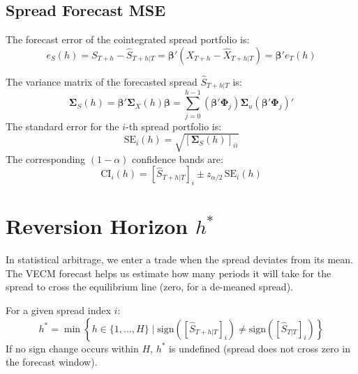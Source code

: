 \documentclass[10pt,a4paper,twocolumn]{article}
\newcommand{\bbeta}{\boldsymbol{\beta}}
\newcommand{\bSigma}{\boldsymbol{\Sigma}}
\newcommand{\bPhi}{\boldsymbol{\Phi}}
\begin{document}
\subsection{Spread Forecast MSE}
The forecast error of the cointegrated spread portfolio is:
\[
  e_S(h) = S_{T+h} - \hat{S}_{T+h|T} = \bbeta' \left( X_{T+h} - \hat{X}_{T+h|T} \right) = \bbeta' e_T(h)
\]

\begin{tcolorbox}[mathbox={Spread Forecast Variance and Confidence Bands}]
The variance matrix of the forecasted spread $\hat{S}_{T+h|T}$ is:
\begin{equation}
  \bSigma_S(h) = \bbeta' \bSigma_X(h) \bbeta = \sum_{j=0}^{h-1} \left( \bbeta' \bPhi_j \right) \bSigma_u \left( \bbeta' \bPhi_j \right)'
  \label{eq:spread_mse}
\end{equation}
The standard error for the $i$-th spread portfolio is:
\[
  \text{SE}_i(h) = \sqrt{[\bSigma_S(h)]_{ii}}
\]
The corresponding $(1-\alpha)$ confidence bands are:
\begin{equation}
  \text{CI}_i(h) = [\hat{S}_{T+h|T}]_i \pm z_{\alpha/2} \, \text{SE}_i(h)
\end{equation}
\end{tcolorbox}

\section{Reversion Horizon $h^*$}

In statistical arbitrage, we enter a trade when the spread deviates from its mean. The VECM forecast helps us estimate how many periods it will take for the spread to cross the equilibrium line (zero, for a de-meaned spread).

\begin{tcolorbox}[mathbox={Zero-Crossing Horizon $h^*$}]
For a given spread index $i$:
\begin{equation}
  h^* = \min \left\{ h \in \{1, \dots, H\} \mid \text{sign}( [\hat{S}_{T+h|T}]_i ) \neq \text{sign}( [\hat{S}_{T|T}]_i ) \right\}
\end{equation}
If no sign change occurs within $H$, $h^*$ is undefined (spread does not cross zero in the forecast window).
\end{tcolorbox}

\end{document}
